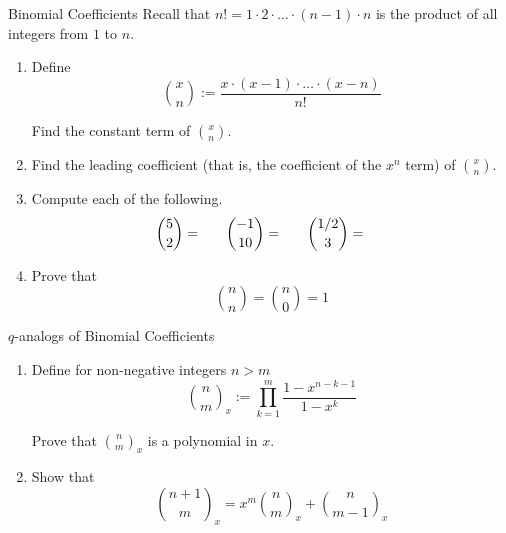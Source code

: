 \documentclass[12pt,letterpaper]{article}
\begin{document}
\begin{problem}{Binomial Coefficients}
  Recall that \(n! = 1\cdot2 \cdot \dots \cdot (n-1) \cdot n\) is the product
  of all integers from \(1\) to \(n\).

  \begin{enumerate}
    \item Define \[
      \binom{x}{n} := \frac{x\cdot(x-1)\cdot\dots\cdot(x-n)}{n!}
    \]

    Find the constant term of \(\binom{x}{n}\).
    \item Find the leading coefficient (that is, the coefficient of the \(x^n\)
    term) of \(\binom{x}{n}\).
    \item Compute each of the following. \[
      \binom{5}{2} = \hspace{4ex}
      \binom{-1}{10} = \hspace{4ex}
      \binom{1/2}{3} = \hspace{4ex}
    \]
    \item Prove that \[
      \binom{n}{n} = \binom{n}{0} = 1
    \]
  \end{enumerate}
\end{problem}

\begin{problem}{\(q\)-analogs of Binomial Coefficients}
  \begin{enumerate}
    \item Define for non-negative integers \(n > m\) \[
      \binom{n}{m}_x := \prod_{k=1}^{m} \frac{1-x^{n-k-1}}{1-x^{k}}
    \]

    Prove that \(\binom{n}{m}_x\) is a polynomial in \(x\).
    \item Show that \[
      \binom{n+1}{m}_x = x^m \binom{n}{m}_x + \binom{n}{m-1}_x
    \]
  \end{enumerate}
\end{problem}
\end{document}
